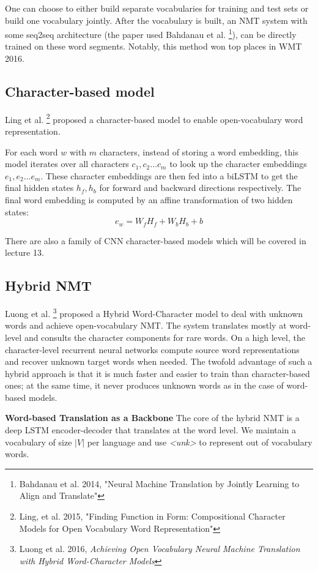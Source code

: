 \documentclass{tufte-handout}
\begin{document}
One can choose to either build separate vocabularies for training and test sets or build one vocabulary jointly. After the vocabulary is built, an NMT system with some seq2seq architecture (the paper used Bahdanau et al. \footnote{Bahdanau et al. 2014, "Neural Machine Translation by Jointly Learning to Align and Translate"}), can be directly trained on these word segments. Notably, this method won top places in WMT 2016.

\subsection{Character-based model}
Ling et al. \footnote{Ling, et al. 2015, "Finding Function in Form: Compositional Character Models for Open Vocabulary Word Representation"} proposed a character-based model to enable open-vocabulary word representation.

For each word $w$ with $m$ characters, instead of storing a word embedding, this model iterates over all characters $c_1,c_2 \ldots c_m$ to look up the character embeddings  $e_1,e_2 \ldots e_m$. These character embeddings are then fed into a biLSTM to get the final hidden states $h_f,h_b$ for forward and backward directions respectively. The final word embedding is computed by an affine transformation of two hidden states:
\[e_w = W_fH_f+W_bH_b + b\]

There are also a family of CNN character-based models which will be covered in lecture 13.

\subsection{Hybrid NMT}
Luong et al. \footnote{Luong et al. 2016, \textit{Achieving Open Vocabulary Neural Machine Translation
with Hybrid Word-Character Models}} proposed a Hybrid Word-Character model to deal with unknown words and achieve open-vocabulary NMT. The system translates mostly at word-level and consults the character components for rare words. On a high level, the character-level recurrent neural networks compute source word representations and recover unknown target words when needed. The twofold advantage of such a hybrid approach is that it is much faster and easier to train than character-based ones; at the same time, it never produces unknown words as in the case of word-based models.

\textbf{Word-based Translation as a Backbone} The core of the hybrid NMT is a deep LSTM encoder-decoder that translates at the word level. We maintain a vocabulary of size $|V|$ per language and use \textit{<unk>} to represent out of vocabulary words.
\end{document}
